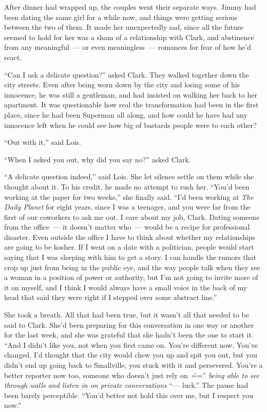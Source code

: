 \documentclass[ebook,12pt]{memoir}
\begin{document}
After dinner had wrapped up, the couples went their separate ways. Jimmy
had been dating the same girl for a while now, and things were getting
serious between the two of them. It made her unexpectedly sad, since all
the future seemed to hold for her was a sham of a relationship with
Clark, and abstinence from any meaningful~--- or even meaningless~---
romances for fear of how he'd react.

``Can I ask a delicate question?'' asked Clark. They walked together
down the city streets. Even after being worn down by the city and losing
some of his innocence, he was still a gentleman, and had insisted on
walking her back to her apartment. It was questionable how real the
transformation had been in the first place, since he had been Superman
all along, and how could he have had any innocence left when he could
see how big of bastards people were to each other?

``Out with it,'' said Lois.

``When I asked you out, why did you say no?'' asked Clark.

``A delicate question indeed,'' said Lois. She let silence settle on
them while she thought about it. To his credit, he made no attempt to
rush her. ``You'd been working at the paper for two weeks,'' she finally
said. ``I'd been working at \emph{The Daily Planet} for eight years,
since I was a teenager, and you were far from the first of our coworkers
to ask me out. I care about my job, Clark. Dating someone from the
office~--- it doesn't matter who~--- would be a recipe for professional
disaster. Even outside the office I have to think about whether my
relationships are going to be kosher. If I went on a date with a
politician, people would start saying that I was sleeping with him to
get a story. I can handle the rumors that crop up just from being in the
public eye, and the way people talk when they see a woman in a position
of power or authority, but I'm not going to invite more of it on myself,
and I think I would always have a small voice in the back of my head
that said they were right if I stepped over some abstract line.''

She took a breath. All that had been true, but it wasn't all that needed
to be said to Clark. She'd been preparing for this conversation in one
way or another for the last week, and she was grateful that she hadn't
been the one to start it. ``And I didn't like you, not when you first
came on. You're different now. You've changed. I'd thought that the city
would chew you up and spit you out, but you didn't end up going back to
Smallville, you stuck with it and persevered. You're a better reporter
now too, someone who doesn't just rely on~\==='' \emph{being able to see
through walls and listen in on private conversations} ``--- luck.'' The
pause had been barely perceptible. ``You'd better not hold this over me,
but I respect you now.''
\end{document}
